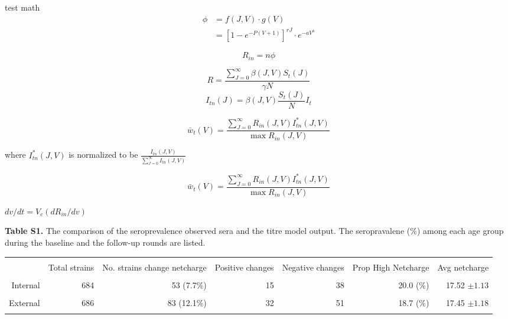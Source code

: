 \documentclass[12pt,a4paper]{article}
\begin{document}
test math \\

\begin{equation}
\begin{split}
\phi   &= f(J,V)\cdot g(V) \\
       &= [1-e^{-P(V+1)}]^{rJ}\cdot e^{-aV^b}
\end{split}
\end{equation}

\begin{equation}
R_{in} = n \phi 
\end{equation}

\begin{equation}
R=\frac{\sum_{J=0}^{\infty}\beta(J,V)S_{t}(J)}{\gamma N}
\end{equation}
\begin{equation}
I_{tn}(J) = \beta(J,V)\frac{S_{t}(J)}{N} {I_{t}}
\end{equation}

\begin{equation}
\bar{w}_{t}(V)=\frac{\sum_{J=0}^{\infty} R_{in}(J,V)I_{tn}^*(J,V)}{\max{R_{in}(J,V)}}
\end{equation}

where $
I_{tn}^*(J,V)$ is normalized to be $\frac{I_{tn}(J,V)}{\sum_{J=0}^{\infty}I_{tn}(J,V)}
$

\begin{equation}
\bar{w}_{t}(V)=\frac{\sum_{J=0}^{\infty} R_{in}(J,V)I_{tn}^*(J,V)}{\max{R_{in}(J,V)}}
\end{equation}

\( dv/dt =V_{c}(dR_{in}/dv) \) 



{\bf Table S1.} The comparison of the seroprevalence observed sera and the titre model output. The seropravalene (\%) among each age group during the baseline and the follow-up rounds are listed.

\begin{tabular*}{16cm}{rrrrrrr}

\hline\hline \\%

   & Total strains&  \parbox[c]{1.8 cm}{\raggedright No. strains change netcharge}  &    \parbox[c]{1.8cm}{\raggedright Positive changes} &   \parbox[c]{1.8cm}{\raggedright Negative changes} &     \parbox[c]{1.8cm}{\raggedright Prop High Netcharge}    &     \parbox[c]{1.8cm}{\raggedright Avg netcharge}   \\
\hline \\ %

Internal &  684 & 53 (7.7\%) &  15 &   38 & 20.0 (\%) & 17.52 $\pm 1.13$\\ \\

External &  686 & 83 (12.1\%) &  32 &   51 & 18.7 (\%)& 17.45 $\pm 1.18$\\ \\


\hline %
\end{tabular*}
\end{document}
